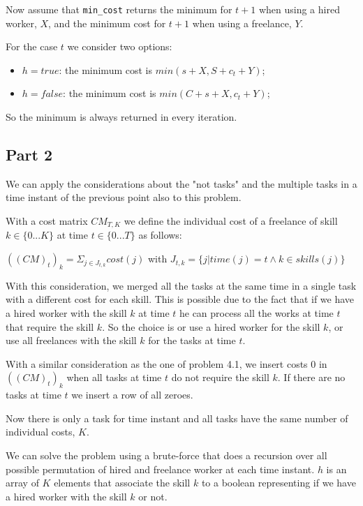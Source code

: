 \documentclass[paper=a4, fontsize=11pt]{scrartcl} %
\numberwithin{equation}{section} %
\numberwithin{figure}{section} %
\numberwithin{table}{section} %
\begin{document}
Now assume that \verb|min_cost| returns the minimum for $t+1$ when using a hired worker, $X$, and the minimum cost for $t+1$ when using a freelance, $Y$.

For the case $t$ we consider two options:
\begin{itemize}
    \item $h = true$: the minimum cost is $min(s + X, S + c_t + Y)$;
    \item $h = false$: the minimum cost is $min(C + s + X, c_t + Y)$;
\end{itemize}

So the minimum is always returned in every iteration.

\subsection*{Part 2}

We can apply the considerations about the "not tasks" and the multiple tasks in a time instant of the previous point also to this problem.

With a cost matrix $CM_{T,K}$ we define the individual cost of a freelance of skill $k \in \{0 ... K\}$ at time $t \in \{0 ... T\}$ as follows:

\bigskip
$((CM)_t)_k = \Sigma_{j \in J_{t,k}} cost(j)$ with $J_{t,k} = \{j | time(j) = t \land k \in skills(j)\}$
\bigskip

With this consideration, we merged all the tasks at the same time in a single task with a different cost for each skill. 
This is possible due to the fact that if we have a hired worker with the skill $k$ at time $t$ he can process all the works at time $t$ that require the skill $k$.
So the choice is or use a hired worker for the skill $k$, or use all freelances with the skill $k$ for the tasks at time $t$.

With a similar consideration as the one of problem 4.1, we insert costs 0 in $((CM)_t)_k$ when all tasks at time $t$ do not require the skill $k$. If there are no tasks at time $t$ we insert a row of all zeroes.

Now there is only a task for time instant and all tasks have the same number of individual costs, $K$.

We can solve the problem using a brute-force that does a recursion over all possible permutation of hired and freelance worker at each time instant.
$h$ is an array of $K$ elements that associate the skill $k$ to a boolean representing if we have a hired worker with the skill $k$ or not.
\end{document}

